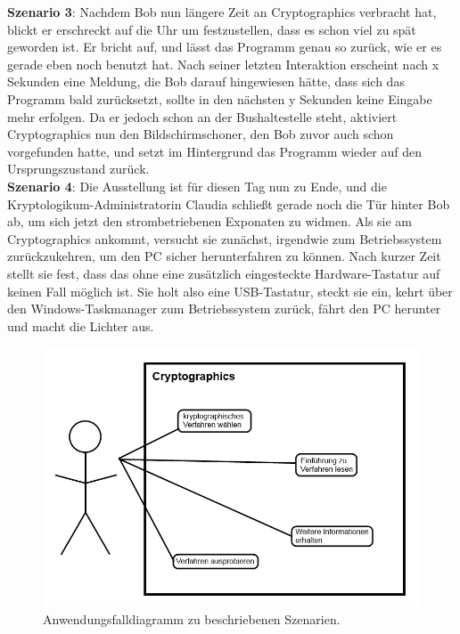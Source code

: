 \documentclass{article}
\begin{document}
\textbf{Szenario 3}:
Nachdem Bob nun längere Zeit an \gls{Cryptographics} verbracht hat, blickt er erschreckt auf die Uhr um festzustellen, dass es schon viel zu spät geworden ist. Er bricht auf, und lässt das Programm genau so zurück, wie er es gerade eben noch benutzt hat. Nach seiner letzten Interaktion erscheint nach x Sekunden eine Meldung, die Bob darauf hingewiesen hätte, dass sich das Programm bald zurücksetzt, sollte in den nächsten y Sekunden keine Eingabe mehr erfolgen. Da er jedoch schon an der Bushaltestelle steht, aktiviert \gls{Cryptographics} nun den Bildschirmschoner, den Bob zuvor auch schon vorgefunden hatte, und setzt im Hintergrund das Programm wieder auf den Ursprungszustand zurück.\\

\textbf{Szenario 4}:
Die Ausstellung ist für diesen Tag nun zu Ende, und die Kryptologikum-Administratorin Claudia schließt gerade noch die Tür hinter Bob ab, um sich jetzt den strombetriebenen Exponaten zu widmen. Als sie am \gls{Cryptographics} ankommt, versucht sie zunächst, irgendwie zum Betriebssystem zurückzukehren, um den PC sicher herunterfahren zu können. Nach kurzer Zeit stellt sie fest, dass das ohne eine zusätzlich eingesteckte Hardware-Tastatur auf keinen Fall möglich ist. Sie holt also eine USB-Tastatur, steckt sie ein, kehrt über den Windows-Taskmanager zum Betriebssystem zurück, fährt den PC herunter und macht die Lichter aus.\\

\begin{figure}[h!]
  \centering
    \includegraphics[width=\textwidth]{resources/usecase1}
  \caption{Anwendungsfalldiagramm zu beschriebenen Szenarien.}
\end{figure}
\end{document}

